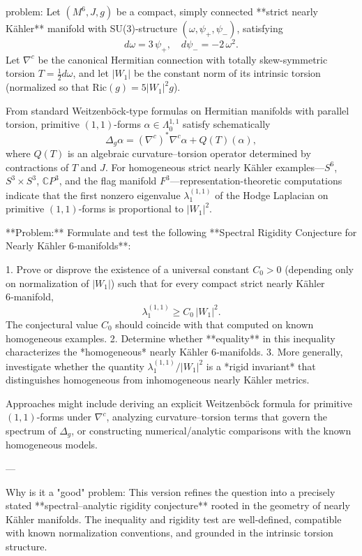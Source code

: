 problem:  
Let \((M^6,J,g)\) be a compact, simply connected **strict nearly Kähler** manifold with SU(3)-structure \((\omega,\psi_+,\psi_-)\), satisfying  
\[
d\omega = 3\,\psi_+ , \quad d\psi_- = -2\,\omega^2.
\]
Let \(\nabla^c\) be the canonical Hermitian connection with totally skew-symmetric torsion \(T = \tfrac{1}{2}d\omega\), and let \(|W_1|\) be the constant norm of its intrinsic torsion (normalized so that \(\mathrm{Ric}(g) = 5 |W_1|^2 g\)).  

From standard Weitzenböck-type formulas on Hermitian manifolds with parallel torsion, primitive \((1,1)\)-forms \(\alpha \in \Lambda^{1,1}_0\) satisfy schematically
\[
\Delta_g \alpha = (\nabla^c)^* \nabla^c \alpha + Q(T)(\alpha),
\]
where \(Q(T)\) is an algebraic curvature–torsion operator determined by contractions of \(T\) and \(J\).  
For homogeneous strict nearly Kähler examples—\(S^6\), \(S^3 \times S^3\), \(\mathbb{C}P^3\), and the flag manifold \(F^3\)—representation-theoretic computations indicate that the first nonzero eigenvalue \(\lambda_1^{(1,1)}\) of the Hodge Laplacian on primitive \((1,1)\)-forms is proportional to \(|W_1|^2\).

**Problem:**  
Formulate and test the following **Spectral Rigidity Conjecture for Nearly Kähler 6‑manifolds**:

1. Prove or disprove the existence of a universal constant \(C_0>0\) (depending only on normalization of \(|W_1|\)) such that for every compact strict nearly Kähler 6‑manifold,
   \[
   \lambda_1^{(1,1)} \ge C_0\,|W_1|^2.
   \]
   The conjectural value \(C_0\) should coincide with that computed on known homogeneous examples.
2. Determine whether **equality** in this inequality characterizes the *homogeneous* nearly Kähler 6‑manifolds.
3. More generally, investigate whether the quantity \(\lambda_1^{(1,1)}/|W_1|^2\) is a *rigid invariant* that distinguishes homogeneous from inhomogeneous nearly Kähler metrics.

Approaches might include deriving an explicit Weitzenböck formula for primitive \((1,1)\)-forms under \(\nabla^c\), analyzing curvature–torsion terms that govern the spectrum of \(\Delta_g\), or constructing numerical/analytic comparisons with the known homogeneous models.

---

Why is it a "good" problem:  
This version refines the question into a precisely stated **spectral–analytic rigidity conjecture** rooted in the geometry of nearly Kähler manifolds. The inequality and rigidity test are well-defined, compatible with known normalization conventions, and grounded in the intrinsic torsion structure.  

